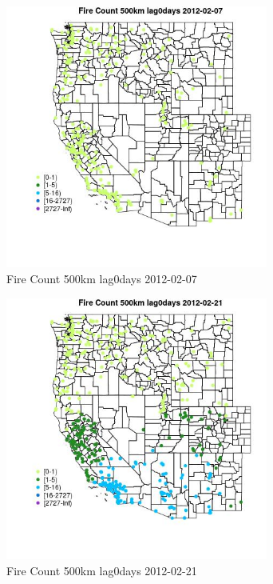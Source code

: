 \begin{figure} 
\centering  
\includegraphics[width=0.77\textwidth]{Code_Outputs/Report_ML_input_PM25_Step4_part_f_de_duplicated_aveswNAs_MapObsFire_Count_500km_lag0days2012-02-07.jpg} 
\caption{\label{fig:Report_ML_input_PM25_Step4_part_f_de_duplicated_aveswNAsMapObsFire_Count_500km_lag0days2012-02-07}Fire Count 500km lag0days 2012-02-07} 
\end{figure} 
 

\begin{figure} 
\centering  
\includegraphics[width=0.77\textwidth]{Code_Outputs/Report_ML_input_PM25_Step4_part_f_de_duplicated_aveswNAs_MapObsFire_Count_500km_lag0days2012-02-21.jpg} 
\caption{\label{fig:Report_ML_input_PM25_Step4_part_f_de_duplicated_aveswNAsMapObsFire_Count_500km_lag0days2012-02-21}Fire Count 500km lag0days 2012-02-21} 
\end{figure} 
 

